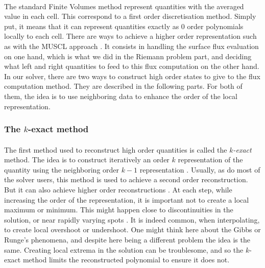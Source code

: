       \paragraph{}
      The standard Finite Volumes method represent quantities with the averaged value in each cell.
      This correspond to a first order discretisation method.
      Simply put, it means that it can represent quantities exactly as 0 order polynomials locally to each cell.
      There are ways to achieve a higher order representation such as with the MUSCL approach .
      It consists in handling the surface flux evaluation on one hand, which is what we did in the Riemann problem part, and deciding what left and right quantities to feed to this flux computation on the other hand.
      In our solver, there are two ways to construct high order states to give to the flux computation method.
      They are described in the following parts.
      For both of them, the idea is to use neighboring data to enhance the order of the local representation.


      \subsubsection{The $k$-exact method}

        \paragraph{}
        The first method used to reconstruct high order quantities is called the \emph{$k$-exact} method.
        The idea is to construct iteratively an order $k$ representation of the quantity using the neighboring order $k-1$ representation \cite{HaiderCroisilleCourbet2009}.
        Usually, as do most of the solver users, this method is used to achieve a second order reconstruction.
        But it can also achieve higher order reconstructions \cite{HaiderCroisilleCourbet2011, HaiderCourbetCroisille2018, PontBrennerCinellaEtAl2017}.
        At each step, while increasing the order of the representation, it is important not to create a local maximum or minimum.
        This might happen close to discontinuities in the solution, or near rapidly varying spots .
        It is indeed common, when interpolating, to create local overshoot or undershoot.
        One might think here about the Gibbs or Runge's phenomena, and despite here being a different problem the idea is the same.
        Creating local extrema in the solution can be troublesome, and so the $k$-exact method limits the reconstructed polynomial to ensure it does not.


